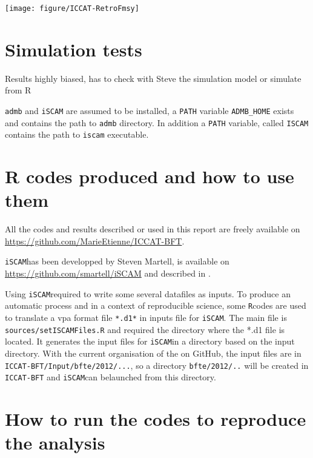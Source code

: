 \documentclass[a4paper]{article}\usepackage{graphicx, color}
\makeatletter
\def\maxwidth{ %
  \ifdim\Gin@nat@width>\linewidth
    \linewidth
  \else
    \Gin@nat@width
  \fi
}
\newenvironment{knitrout}{}{} %
\newcommand{\rcode}{\texttt{R}}
\newcommand{\iscam}{\texttt{iSCAM}}
\makeatother
\begin{document}
\begin{knitrout}
\color{fgcolor}

{\centering \texttt{[image: figure/ICCAT-RetroFmsy]} 

}



\end{knitrout}



\section{Simulation tests}
Results highly biased, has to check with Steve the simulation model or simulate from R 

\appendix
\verb+admb+ and \verb+iSCAM+ are assumed to be installed, a \verb+PATH+ variable \verb+ADMB_HOME+ exists and contains the path to \verb+admb+ directory. In addition a \verb+PATH+ variable, called \verb+ISCAM+ contains the path to \verb+iscam+ executable.   
\section{R codes produced and how to use them}
All the codes and results described  or used in this report are freely
available on \url{https://github.com/MarieEtienne/ICCAT-BFT}. 

\iscam  has  been  developped  by  Steven  Martell,  is  available  on
\url{https://github.com/smartell/iSCAM} and described in \cite{Martell11}.

Using \iscam  required to write  some several datafiles as  inputs. To
produce an automatic process and in a context of reproducible science,
some \rcode codes  are used to translate a vpa  format file \verb+*.d1*+ in
inputs     file      for     \iscam.     The     main      file     is
\verb+sources/setISCAMFiles.R+  and required  the directory  where the
*.d1 file  is located. It  generates the input  files for \iscam  in a
directory based on the input  directory. With the current organisation
of the on GitHub, the input files are in \verb+ICCAT-BFT/Input/bfte/2012/...+, so
a directory  \verb+bfte/2012/..+ will  be created  in \verb+ICCAT-BFT+
and \iscam can belaunched from this directory.

\section{How to run the codes to reproduce the analysis}


\end{document}
